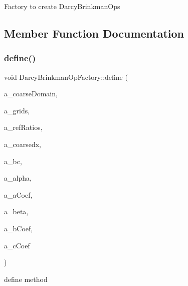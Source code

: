 Factory to create Darcy\+Brinkman\+Ops 

\subsection{Member Function Documentation}
\mbox{\label{class_darcy_brinkman_op_factory_adffcc15076241ed69d214197b2c21433}} 
\subsubsection{\texorpdfstring{define()}{define()}\hspace{0.1cm}{\footnotesize\ttfamily [1/2]}}
{\footnotesize\ttfamily void Darcy\+Brinkman\+Op\+Factory\+::define (\begin{DoxyParamCaption}\item[{const \textbf{ Problem\+Domain} \&}]{a\+\_\+coarse\+Domain,  }\item[{const \textbf{ Vector}$<$ \textbf{ Disjoint\+Box\+Layout} $>$ \&}]{a\+\_\+grids,  }\item[{const \textbf{ Vector}$<$ int $>$ \&}]{a\+\_\+ref\+Ratios,  }\item[{const \textbf{ Real} \&}]{a\+\_\+coarsedx,  }\item[{\textbf{ B\+C\+Holder}}]{a\+\_\+bc,  }\item[{const \textbf{ Real} \&}]{a\+\_\+alpha,  }\item[{\textbf{ Vector}$<$ \textbf{ Ref\+Counted\+Ptr}$<$ \textbf{ Level\+Data}$<$ \textbf{ F\+Array\+Box} $>$ $>$ $>$ \&}]{a\+\_\+a\+Coef,  }\item[{const \textbf{ Real} \&}]{a\+\_\+beta,  }\item[{\textbf{ Vector}$<$ \textbf{ Ref\+Counted\+Ptr}$<$ \textbf{ Level\+Data}$<$ \textbf{ Flux\+Box} $>$ $>$ $>$ \&}]{a\+\_\+b\+Coef,  }\item[{\textbf{ Vector}$<$ \textbf{ Ref\+Counted\+Ptr}$<$ \textbf{ Level\+Data}$<$ \textbf{ F\+Array\+Box} $>$ $>$ $>$ \&}]{a\+\_\+c\+Coef }\end{DoxyParamCaption})}



define method 

